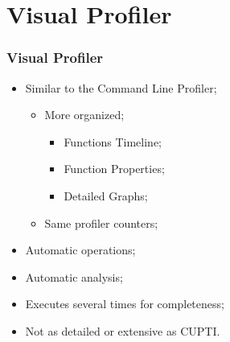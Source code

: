 \section{Visual Profiler}

{
	\frame[plain]{}
}

\begin{frame}
	\frametitle{Visual Profiler}
	\begin{itemize}
		\item Similar to the Command Line Profiler;
		\begin{itemize}
			\item More organized;
			\begin{itemize}
				\item Functions Timeline;
				\item Function Properties;
				\item Detailed Graphs;
			\end{itemize}
			\item Same profiler counters;
		\end{itemize}
		\item Automatic operations;
		\item Automatic analysis;
		\item Executes several times for completeness;
		\item Not as detailed or extensive as CUPTI.
	\end{itemize}
\end{frame}